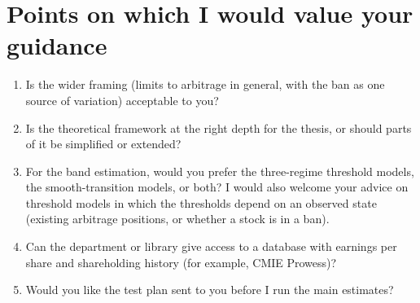 \section{Points on which I would value your guidance}\label{sec:questions}
\begin{enumerate}
\item Is the wider framing (limits to arbitrage in general, with the ban as one source of variation) acceptable to you?
\item Is the theoretical framework at the right depth for the thesis, or should parts of it be simplified or extended?
\item For the band estimation, would you prefer the three-regime threshold models, the smooth-transition models, or both? I
would also welcome your advice on threshold models in which the thresholds depend on an observed state (existing arbitrage
positions, or whether a stock is in a ban).
\item Can the department or library give access to a database with earnings per share and shareholding history (for example,
CMIE Prowess)?
\item Would you like the test plan sent to you before I run the main estimates?
\end{enumerate}

